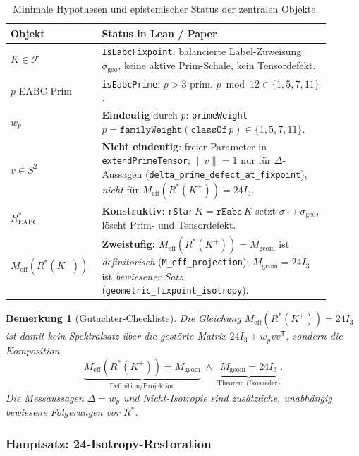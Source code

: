 \documentclass[11pt,a4paper]{article}
\newtheorem{remark}{Bemerkung}
\begin{document}
	\begin{table}[h!]
		\centering
		\small
		\begin{tabular}{p{0.22\linewidth}p{0.68\linewidth}}
			\hline
			\textbf{Objekt} & \textbf{Status in Lean / Paper} \\
			\hline
			$K\in\mathcal{F}$
			& \texttt{IsEabcFixpoint}: balancierte Label-Zuweisung $\sigma_{\mathrm{geo}}$,
			keine aktive Prim-Schale, kein Tensordefekt. \\
			$p$ EABC-Prim
			& \texttt{isEabcPrime}: $p>3$ prim, $p\bmod 12\in\{1,5,7,11\}$. \\
			$w_p$
			& \textbf{Eindeutig} durch $p$: \texttt{primeWeight}\,$p=
			\texttt{familyWeight}(\texttt{classOf}\,p)\in\{1,5,7,11\}$. \\
			$v\in S^2$
			& \textbf{Nicht eindeutig}: freier Parameter in
			\texttt{extendPrimeTensor}; $\|v\|=1$ nur für $\Delta$-Aussagen
			(\texttt{delta\_prime\_defect\_at\_fixpoint}), \emph{nicht} für
			$M_{\mathrm{eff}}(R^*(K^+))=24I_3$. \\
			$R^*_{\mathrm{EABC}}$
			& \textbf{Konstruktiv}: \texttt{rStar}\,$K=\texttt{rEabc}\,K$ setzt
			$\sigma\mapsto\sigma_{\mathrm{geo}}$, löscht Prim- und Tensordefekt. \\
			$M_{\mathrm{eff}}(R^*(K^+))$
			& \textbf{Zweistufig:}
			$M_{\mathrm{eff}}(R^*(K^+))=M_{\mathrm{geom}}$ ist
			\emph{definitorisch} (\texttt{M\_eff\_projection});
			$M_{\mathrm{geom}}=24I_3$ ist \emph{bewiesener Satz}
			(\texttt{geometric\_fixpoint\_isotropy}). \\
			\hline
		\end{tabular}
		\caption{Minimale Hypothesen und epistemischer Status der zentralen Objekte.}
		\label{tab:main-hypotheses}
	\end{table}
	
	\begin{remark}[Gutachter-Checkliste]
		Die Gleichung $M_{\mathrm{eff}}(R^*(K^+))=24I_3$ ist damit \emph{kein}
		Spektralsatz über die gestörte Matrix $24I_3+w_pvv^{\mathsf T}$, sondern
		die Komposition
		\[
		\underbrace{M_{\mathrm{eff}}(R^*(K^+))=M_{\mathrm{geom}}}_{\text{Definition/Projektion}}
		\;\wedge\;
		\underbrace{M_{\mathrm{geom}}=24I_3}_{\text{Theorem (Ikosaeder)}}.
		\]
		Die Messaussagen $\Delta=w_p$ und Nicht-Isotropie sind \emph{zusätzliche},
		unabhängig bewiesene Folgerungen vor $R^*$.
	\end{remark}
	
	\subsubsection{Hauptsatz: 24-Isotropy-Restoration}
	
\end{document}
